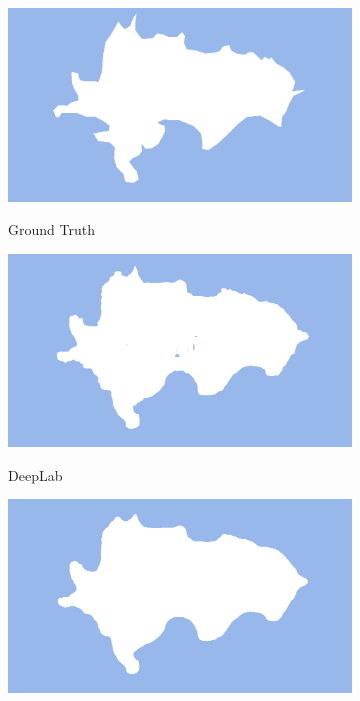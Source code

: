 \documentclass[a4paper,12pt]{ctexart}
\begin{document}
\begin{figure}[h]
    \begin{subfigure}{0.25\textwidth}
        \centering
        \includegraphics[width=\linewidth]{figures/CAMO_demo1/CAMO_demo1_gt.png}
        \label{fig:demo1_gt}
        \caption{Ground Truth}
    \end{subfigure}%
    \hfill
    \begin{subfigure}{0.25\textwidth}
        \centering
        \includegraphics[width=\linewidth]{figures/CAMO_demo1/CAMO_demo1_pred_ssvm.png}
        \label{fig:demo1_dlap}
        \caption{DeepLab}
    \end{subfigure}%
    \hfill
    \begin{subfigure}{0.25\textwidth}
        \centering
        \includegraphics[width=\linewidth]{figures/CAMO_demo1/CAMO_demo1_pred_crf.png}

\end{subfigure}
\end{figure}
\end{document}
